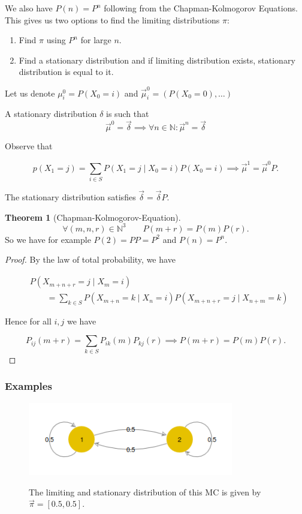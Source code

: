 \documentclass{article}
\theoremstyle{definition}
\newtheorem{theorem}{Theorem}[section]
\begin{document}
We also have $P(n) = P^n$ following from the Chapman-Kolmogorov Equations. This gives us two options to find the limiting distributions $\pi$:

\begin{enumerate}
\item Find $\pi$ using $P^n$ for large $n$.
\item Find a stationary distribution and if limiting distribution exists, stationary distribution is equal to it.
\end{enumerate}

Let us denote $\mu_i^0 = P(X_0 = i)$ and $\vec{\mu}^0_i = \left( P(X_0 = 0), \ldots \right)$

A stationary distribution $\delta$ is such that
$$
\vec{\mu}^0 = \vec{\delta} \implies \forall n \in \mathbb{N}: \vec{\mu}^n = \vec{\delta}
$$

Observe that

$$
p(X_1 = j) = \sum_{i \in S} P(X_1 = j \mid X_0 = i ) P(X_0 = i) \implies \vec{\mu}^1 = \vec{\mu}^0 P.
$$

The stationary distribution satisfies $ \vec \delta = \vec \delta P$.

\begin{theorem}[Chapman-Kolmogorov-Equation]
$$
\forall (m, n, r) \in \mathbb{N}^3 \qquad P(m + r) = P(m) P(r).
$$
So we have for example $P(2) = P P = P^2$ and $P(n) = P^n$.
\begin{proof}
By the law of total probability, we have

\begin{align*}
&P \left( X_{m + n + r} = j \mid X_m = i \right) \\
&\qquad = \sum_{k \in S} P \left( X_{m + n} = k \mid X_n = i \right) P \left( X_{m + n + r} = j \mid X_{n+m} = k \right)
\end{align*}

Hence for all $i,j$ we have

$$
P_{ij}(m+r) = \sum_{k \in S} P_{ik}(m) P_{kj}(r) \implies P(m+r) = P(m) P(r).
$$

\end{proof}
\end{theorem}

\subsubsection*{Examples}

\begin{figure}[h!]
\centering
\includegraphics[width=0.8\textwidth]{images/exmc1}
\label{fig:exmc1}
\caption{ The limiting and stationary distribution of this MC is given by $\vec \pi = [0.5, 0.5]$.}
\end{figure}
\end{document}
